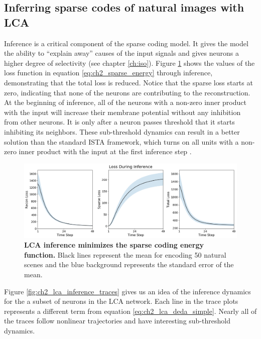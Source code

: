 \subsection{Inferring sparse codes of natural images with LCA}
Inference is a critical component of the sparse coding model. It gives the model the ability to ``explain away'' causes of the input signals \parencite{olshausen1997sparse} and gives neurons a higher degree of selectivity (see chapter \ref{ch:iso}). Figure \ref{fig:ch2_lca_inference_loss} shows the values of the loss function in equation \ref{eq:ch2_sparse_energy} through inference, demonstrating that the total loss is reduced. Notice that the sparse loss starts at zero, indicating that none of the neurons are contributing to the reconstruction. At the beginning of inference, all of the neurons with a non-zero inner product with the input will increase their membrane potential without any inhibition from other neurons. It is only after a neuron passes threshold that it starts inhibiting its neighbors. These sub-threshold dynamics can result in a better solution than the standard ISTA framework, which turns on all units with a non-zero inner product with the input at the first inference step \cite{rozell2008sparse}.

\begin{figure}[h]\label{fig:ch2_lca_inference_loss}
    \centering
    \includegraphics[width=\textwidth]{figures/lca_inference_loss.png}
    \caption{\textbf{LCA inference minimizes the sparse coding energy function.} Black lines represent the mean for encoding 50 natural scenes and the blue background represents the standard error of the mean.}
\end{figure}

Figure \ref{fig:ch2_lca_inference_traces} gives us an idea of the inference dynamics for the a subset of neurons in the LCA network. Each line in the trace plots represents a different term from equation \ref{eq:ch2_lca_deda_simple}. Nearly all of the traces follow nonlinear trajectories and have interesting sub-threshold dynamics.

